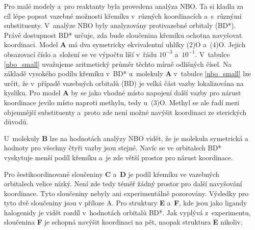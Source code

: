 \documentclass[
digital, %
table,   %
nolof,     %
nolot,     %
oneside,
]{fithesis3}
\begin{document}
Pro malé modely a~pro reaktanty byla provedena analýza NBO. Ta si kladla za cíl lépe popsat vazebné možnosti křemíku v~různých koordinacích a~s~různými substituenty. V~analýze NBO byly analyzovány protivazebné orbitaly (BD*). Právě dostupnost BD* určuje, zda bude sloučenina křemíku ochotna navyšovat koordinaci. Model \textbf{A} má dva symetricky ekvivalentní uhlíky (2)O a~(4)O. Jejich obsazovací číslo a~složení se ve výpočtu líší v~řádu $10^{-3}$ a~$10^{-1}$. V~tabulce \ref{nbo_small} uvažujeme aritmetický průměr těchto mírně odlišných čísel. Na základě vysokého podílu křemíku v~BD* u~molekuly \textbf{A} v~tabulce \ref{nbo_small} lze určit, že v~případě vazebných orbitalů (BD) je velká část vazby lokalizována na kyslíku. Pro model \textbf{A} by se jako vhodné místo napojení další vazby pro nárust koordinace jevilo místo  naproti methylu, tedy u~(3)O. Methyl se ale řadí mezi objemnější substituenty a~proto zde není možné navýšit koordinaci ze sterických důvodů.

 U~molekuly \textbf{B} lze na hodnotách analýzy NBO vidět, že je molekula symetrická a hodnoty pro všechny čtyři vazby jsou stejné. Navíc se ve orbitalech BD* vyskytuje menší podíl křemíku a~je zde větší prostor pro nárust koordinace.

Pro šestikoordinované sloučeniny \textbf{C} a~\textbf{D} je podíl křemíku ve vazebných orbitalech velice nízký. Není zde tedy téměř žádný prostor pro další navyšování koordinace. Tyto sloučeniny nebyly ani experimentálně pozorovány. Výsledky pro tyto dvě sloučeniny jsou v příloze A. Pro struktury \textbf{E} a~\textbf{F}, kde jsou jako ligandy halogenidy je vidět rozdíl v~hodnotách orbitalů BD*. Jak vyplývá z~experimentu, sloučenina \textbf{F} je schopná navýšit koordinaci na pět, naopak struktura \textbf{E} nikoliv.
\end{document}
